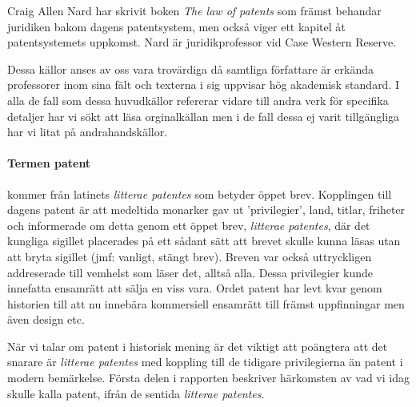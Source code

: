 Craig Allen Nard har skrivit boken \emph{The law of patents} som främst 
behandar juridiken bakom dagens patentsystem, men också viger ett kapitel åt 
patentsystemets uppkomst. Nard är juridikprofessor vid Case Western Reserve.

Dessa källor anses av oss vara trovärdiga då samtliga författare är erkända 
professorer inom sina fält och texterna i sig uppvisar hög akademisk standard. 
I alla de fall som dessa huvudkällor refererar vidare till andra verk för 
specifika detaljer har vi sökt att läsa orginalkällan men i de fall dessa ej 
varit tillgängliga har vi litat på andrahandskällor.

\paragraph{Termen patent} kommer från latinets \emph{litterae patentes} som betyder öppet 
brev. Kopplingen till dagens patent är att medeltida monarker gav ut
'privilegier', land, titlar, friheter och informerade om detta genom ett öppet 
brev, \emph{litterae patentes}, där det kungliga sigillet placerades på ett
sådant sätt att brevet skulle kunna läsas utan att bryta sigillet (jmf: 
vanligt, stängt brev). Breven var också uttryckligen addreserade till 
vemhelst som läser det, alltså alla. Dessa privilegier kunde innefatta ensamrätt
att sälja en viss vara. Ordet patent har levt kvar genom historien till 
att nu innebära kommersiell ensamrätt till främst uppfinningar men även 
design etc. \cite{blackstone vad hänvisas?}

När vi talar om patent i historisk mening är det viktigt att poängtera att det 
snarare är \emph{litterae patentes} med koppling till de tidigare 
privilegierna än patent i modern bemärkelse. Första delen i rapporten beskriver
härkomsten av vad vi idag skulle kalla patent, ifrån de sentida \emph{litterae patentes}.